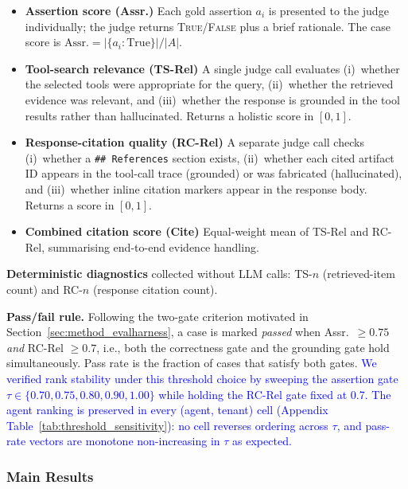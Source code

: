 \begin{itemize}[leftmargin=*,itemsep=2pt,topsep=4pt]
  \item \textbf{Assertion score (Assr.)}  Each gold assertion $a_i$ is presented to the judge individually; the judge returns \textsc{True}/\textsc{False} plus a brief rationale. The case score is $\text{Assr.} = |\{a_i : \text{True}\}| / |A|$.
  \item \textbf{Tool-search relevance (TS-Rel)}  A single judge call evaluates (i)~whether the selected tools were appropriate for the query, (ii)~whether the retrieved evidence was relevant, and (iii)~whether the response is grounded in the tool results rather than hallucinated. Returns a holistic score in $[0,1]$.
  \item \textbf{Response-citation quality (RC-Rel)}  A separate judge call checks (i)~whether a \texttt{\#\#~References} section exists, (ii)~whether each cited artifact ID appears in the tool-call trace (grounded) or was fabricated (hallucinated), and (iii)~whether inline citation markers appear in the response body. Returns a score in $[0,1]$.
  \item \textbf{Combined citation score (Cite)}  Equal-weight mean of TS-Rel and RC-Rel, summarising end-to-end evidence handling.
\end{itemize}

\textbf{Deterministic diagnostics} collected without LLM calls: TS-$n$ (retrieved-item count) and RC-$n$ (response citation count).

\textbf{Pass/fail rule.}  Following the two-gate criterion motivated in Section~\ref{sec:method_evalharness}, a case is marked \emph{passed} when Assr.\ $\geq 0.75$ \emph{and} RC-Rel $\geq 0.7$, i.e., both the correctness gate and the grounding gate hold simultaneously. Pass rate is the fraction of cases that satisfy both gates. \textcolor{blue}{We verified rank stability under this threshold choice by sweeping the assertion gate $\tau \in \{0.70, 0.75, 0.80, 0.90, 1.00\}$ while holding the RC-Rel gate fixed at 0.7. The agent ranking is preserved in every (agent, tenant) cell (Appendix Table~\ref{tab:threshold_sensitivity}): no cell reverses ordering across $\tau$, and pass-rate vectors are monotone non-increasing in $\tau$ as expected.}

\subsubsection{Main Results}
\label{sec:main-results}

